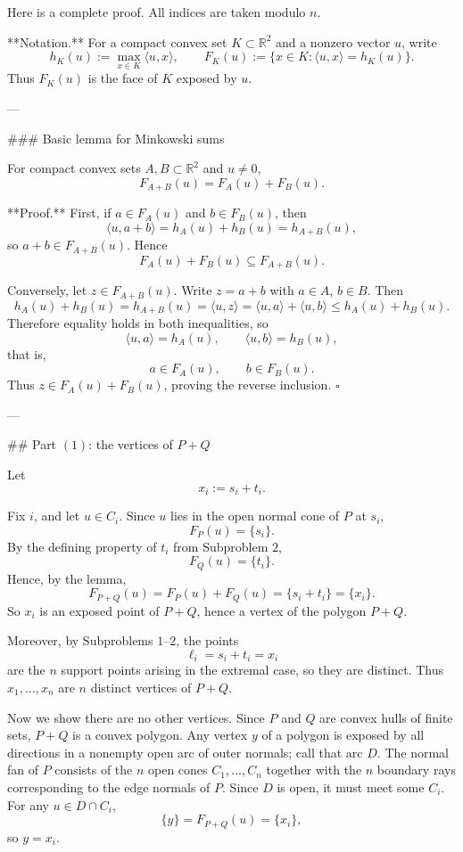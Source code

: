 Here is a complete proof. All indices are taken modulo \(n\).

**Notation.** For a compact convex set \(K\subset \mathbb{R}^2\) and a nonzero vector \(u\), write
\[
h_K(u):=\max_{x\in K}\langle u,x\rangle,
\qquad
F_K(u):=\{x\in K:\langle u,x\rangle=h_K(u)\}.
\]
Thus \(F_K(u)\) is the face of \(K\) exposed by \(u\).

---

### Basic lemma for Minkowski sums

For compact convex sets \(A,B\subset\mathbb{R}^2\) and \(u\neq 0\),
\[
F_{A+B}(u)=F_A(u)+F_B(u).
\]

**Proof.** First, if \(a\in F_A(u)\) and \(b\in F_B(u)\), then
\[
\langle u,a+b\rangle
=
h_A(u)+h_B(u)
=
h_{A+B}(u),
\]
so \(a+b\in F_{A+B}(u)\). Hence
\[
F_A(u)+F_B(u)\subseteq F_{A+B}(u).
\]

Conversely, let \(z\in F_{A+B}(u)\). Write \(z=a+b\) with \(a\in A\), \(b\in B\). Then
\[
h_A(u)+h_B(u)
=
h_{A+B}(u)
=
\langle u,z\rangle
=
\langle u,a\rangle+\langle u,b\rangle
\le h_A(u)+h_B(u).
\]
Therefore equality holds in both inequalities, so
\[
\langle u,a\rangle=h_A(u),
\qquad
\langle u,b\rangle=h_B(u),
\]
that is,
\[
a\in F_A(u),\qquad b\in F_B(u).
\]
Thus \(z\in F_A(u)+F_B(u)\), proving the reverse inclusion. \(\square\)

---

## Part \((1)\): the vertices of \(P+Q\)

Let
\[
x_i:=s_i+t_i.
\]

Fix \(i\), and let \(u\in C_i\). Since \(u\) lies in the open normal cone of \(P\) at \(s_i\),
\[
F_P(u)=\{s_i\}.
\]
By the defining property of \(t_i\) from Subproblem \(2\),
\[
F_Q(u)=\{t_i\}.
\]
Hence, by the lemma,
\[
F_{P+Q}(u)=F_P(u)+F_Q(u)=\{s_i+t_i\}=\{x_i\}.
\]
So \(x_i\) is an exposed point of \(P+Q\), hence a vertex of the polygon \(P+Q\).

Moreover, by Subproblems \(1\)–\(2\), the points
\[
\ell_i=s_i+t_i=x_i
\]
are the \(n\) support points arising in the extremal case, so they are distinct. Thus \(x_1,\dots,x_n\) are \(n\) distinct vertices of \(P+Q\).

Now we show there are no other vertices. Since \(P\) and \(Q\) are convex hulls of finite sets, \(P+Q\) is a convex polygon. Any vertex \(y\) of a polygon is exposed by all directions in a nonempty open arc of outer normals; call that arc \(D\). The normal fan of \(P\) consists of the \(n\) open cones \(C_1,\dots,C_n\) together with the \(n\) boundary rays corresponding to the edge normals of \(P\). Since \(D\) is open, it must meet some \(C_i\). For any \(u\in D\cap C_i\),
\[
\{y\}=F_{P+Q}(u)=\{x_i\},
\]
so \(y=x_i\).

